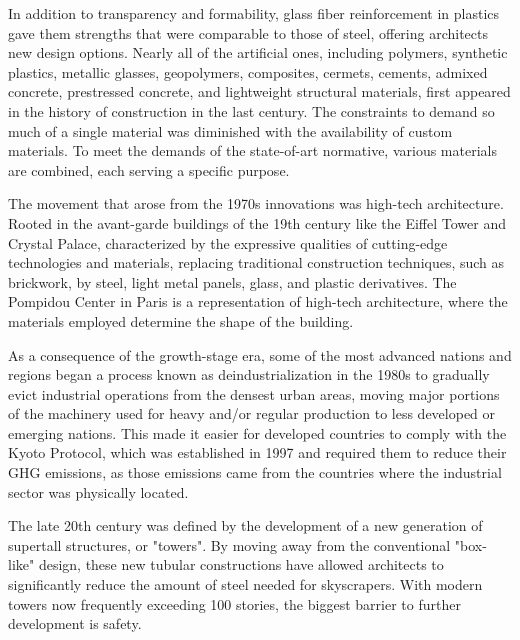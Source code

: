 In addition to transparency and formability, glass fiber reinforcement in plastics gave them strengths that were comparable to those of steel, offering architects new design options.\autocite{koehler1955plastics} Nearly all of the artificial ones, including polymers, synthetic plastics, metallic glasses, geopolymers, composites, cermets, cements, admixed concrete, prestressed concrete, and lightweight structural materials, first appeared in the history of construction in the last century.\autocite{laffarga1997resena} The constraints to demand so much of a single material was diminished with the availability of custom materials. To meet the demands of the state-of-art normative, various materials are combined, each serving a specific purpose.\autocite{krausmann2009growth}

The movement that arose from the 1970s innovations was high-tech architecture. Rooted in the avant-garde buildings of the 19th century like the Eiffel Tower and Crystal Palace, characterized by the expressive qualities of cutting-edge technologies and materials, replacing traditional construction techniques, such as brickwork, by steel, light metal panels, glass, and plastic derivatives.\autocite{sharp2002twentieth} The Pompidou Center in Paris is a representation of high-tech architecture, where the materials employed determine the shape of the building.

As a consequence of the growth-stage era, some of the most advanced nations and regions began a process known as deindustrialization in the 1980s to gradually evict industrial operations from the densest urban areas,\autocite{agueda2016historia} moving major portions of the machinery used for heavy and/or regular production to less developed or emerging nations.\autocite{lopez1993ciudad} This made it easier for developed countries to comply with the Kyoto Protocol, which was established in 1997 and required them to reduce their GHG emissions, as those emissions came from the countries where the industrial sector was physically located.\autocite{agueda2016historia}

The late 20th century was defined by the development of a new generation of supertall structures, or "towers". By moving away from the conventional "box-like" design, these new tubular constructions have allowed architects to significantly reduce the amount of steel needed for skyscrapers. With modern towers now frequently exceeding 100 stories, the biggest barrier to further development is safety.\autocite{sharp2002twentieth}

